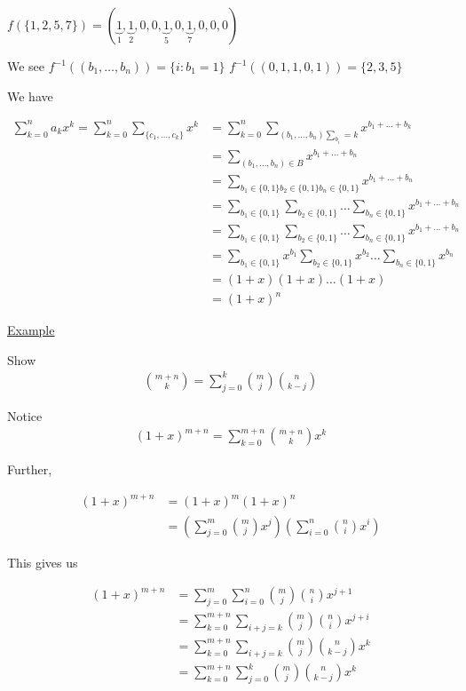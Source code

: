 \documentclass{article}
\begin{document}
$f(\{1,2,5,7\}) = (\underbrace{1}_{1},\underbrace{1}_{2},0,0,\underbrace{1}_{5},0,\underbrace{1}_{7},0,0,0)$

We see $f^{-1}((b_1, \ldots, b_n)) = \{ i : b_1 = 1\}$
$f^{-1}((0,1,1,0,1)) = \{2,3,5\}$

We have 

\begin{align*}
\sum_{k=0}^{n}a_kx^k = \sum_{k=0}^{n}\sum_{\{c_1,\ldots,c_k\} \text{}}x^k &= \sum_{k=0}^{n}\sum_{(b_1,\ldots,b_n) \sum_{b_i}=k} x^{b_1+\ldots+b_k} \\
&= \sum_{(b_1,\ldots,b_n)\in B} x^{b_1+\ldots+b_n} \\
&= \sum_{b_1 \in \{0,1\}b_2\in \{0,1\}b_n \in \{0,1\}}x^{b_1+\ldots+b_n} \\
&= \sum_{b_1\in \{0,1\}} \sum_{b_2\in\{0,1\}} \ldots \sum_{b_n \in \{0,1\}} x^{b_1+\ldots+b_n} \\
&= \sum_{b_1\in \{0,1\}} \sum_{b_2\in\{0,1\}} \ldots \sum_{b_n \in \{0,1\}} x^{b_1+\ldots+b_n} \\
&= \sum_{b_1 \in \{0,1\}} x^{b_1} \sum_{b_2 \in \{0,1\}}x^{b_2} \ldots \sum_{b_n \in \{0,1\}}x^{b_n} \\
&= (1+x)(1+x)\ldots(1+x) \\
&=(1+x)^n
\end{align*}

\underline{Example}

Show
\begin{align*}
\binom{m+n}{k} = \sum_{j=0}^{k}\binom{m}{j}\binom{n}{k-j}
\end{align*}

Notice 
\begin{align*}
(1+x)^{m+n} = \sum_{k=0}^{m+n}\binom{m+n}{k}x^k
\end{align*}

Further,

\begin{align*}
    (1+x)^{m+n} &= (1+x)^m(1+x)^n \\ 
    &= (\sum_{j=0}^{m}\binom{m}{j}x^j)(\sum_{i=0}^{n}\binom{n}{i}x^i)
\end{align*}

This gives us

\begin{align*}
    (1+x)^{m+n} &= \sum_{j=0}^{m}\sum_{i=0}^{n}\binom{m}{j}\binom{n}{i}x^{j+1} \\
    &= \sum_{k=0}^{m+n}\sum_{i+j=k}^{}\binom{m}{j}\binom{n}{i}x^{j+i} \\
    &= \sum_{k=0}^{m+n}\sum_{i+j=k}^{}\binom{m}{j}\binom{n}{k-j}x^k \\
    &= \sum_{k=0}^{m+n}\sum_{j=0}^{k}\binom{m}{j}\binom{n}{k-j}x^k
\end{align*}
\end{document}
